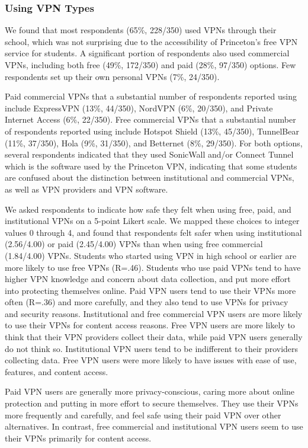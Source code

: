 \subsubsection{Using VPN Types}

We found that most respondents (65\%, 228/350) used VPNs through their school,
which was not surprising due to the accessibility of Princeton’s free VPN
service for students. A significant portion of respondents also used
commercial VPNs, including both free (49\%, 172/350) and paid (28\%, 97/350)
options. Few respondents set up their own personal VPNs (7\%, 24/350).

Paid commercial VPNs that a substantial number of respondents reported using
include ExpressVPN (13\%, 44/350), NordVPN (6\%, 20/350), and Private Internet
Access (6\%, 22/350). Free commercial VPNs that a substantial number of
respondents reported using include Hotspot Shield (13\%, 45/350), TunnelBear
(11\%, 37/350), Hola (9\%, 31/350), and Betternet (8\%, 29/350). For both
options, several respondents indicated that they used SonicWall and/or Connect
Tunnel which is the software used by the Princeton VPN, indicating that some
students are confused about the distinction between institutional and
commercial VPNs, as well as VPN providers and VPN software.

We asked respondents to indicate how safe they felt when using free, paid, and
institutional VPNs on a 5-point Likert scale. We mapped these choices to
integer values 0 through 4, and found that respondents felt safer when using
institutional (2.56/4.00) or paid (2.45/4.00) VPNs than when using free
commercial (1.84/4.00) VPNs. Students who started using VPN in high school or
earlier are more likely to use free VPNs (R=.46). Students who use paid VPNs
tend to have higher VPN knowledge and concern about data collection, and put
more effort into protecting themselves online. Paid VPN users tend to use
their VPNs more often (R=.36) and more carefully, and they also tend to use
VPNs for privacy and security reasons. Institutional and free commercial VPN
users are more likely to use their VPNs for content access reasons. Free VPN
users are more likely to think that their VPN providers collect their data,
while paid VPN users generally do not think so. Institutional VPN users tend
to be indifferent to their providers collecting data. Free VPN users were more
likely to have issues with ease of use, features, and content access.

Paid VPN users are generally more privacy-conscious, caring more about online
protection and putting in more effort to secure themselves. They use their
VPNs more frequently and carefully, and feel safe using their paid VPN over
other alternatives. In contrast, free commercial and institutional VPN users
seem to use their VPNs primarily for content access.


